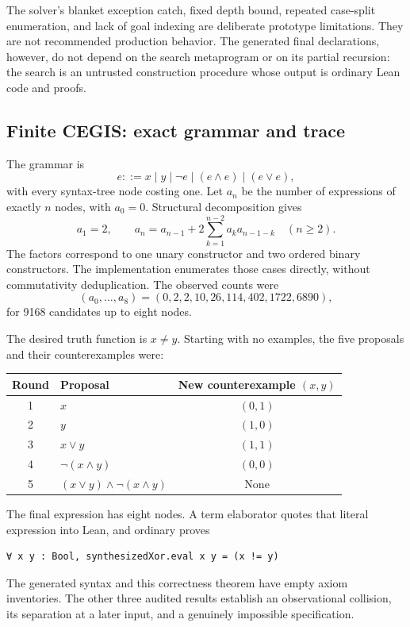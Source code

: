 The solver's blanket exception catch, fixed depth bound, repeated case-split enumeration, and lack of goal indexing are deliberate prototype limitations. They are not recommended production behavior. The generated final declarations, however, do not depend on the search metaprogram or on its partial recursion: the search is an untrusted construction procedure whose output is ordinary Lean code and proofs.

\subsection{Finite CEGIS: exact grammar and trace}

The grammar is
\[
 e::=x\mid y\mid\neg e\mid(e\land e)\mid(e\lor e),
\]
with every syntax-tree node costing one. Let $a_n$ be the number of expressions of exactly $n$ nodes, with $a_0=0$. Structural decomposition gives
\[
 a_1=2,\qquad
 a_n=a_{n-1}+2\sum_{k=1}^{n-2}a_k a_{n-1-k}\quad(n\ge2).
\]
The factors correspond to one unary constructor and two ordered binary constructors. The implementation enumerates those cases directly, without commutativity deduplication. The observed counts were
\[
 (a_0,\ldots,a_8)=(0,2,2,10,26,114,402,1722,6890),
\]
for 9168 candidates up to eight nodes.

The desired truth function is $x\ne y$. Starting with no examples, the five proposals and their counterexamples were:
\begin{center}\small
\begin{tabular}{@{}clc@{}}
\toprule
Round & Proposal & New counterexample $(x,y)$ \\
\midrule
1 & $x$ & $(0,1)$ \\
2 & $y$ & $(1,0)$ \\
3 & $x\lor y$ & $(1,1)$ \\
4 & $\neg(x\land y)$ & $(0,0)$ \\
5 & $(x\lor y)\land\neg(x\land y)$ & None \\
\bottomrule
\end{tabular}
\end{center}
The final expression has eight nodes. A term elaborator quotes that literal expression into Lean, and ordinary  proves
\begin{lstlisting}
∀ x y : Bool, synthesizedXor.eval x y = (x != y)
\end{lstlisting}
The generated syntax and this correctness theorem have empty axiom inventories. The other three audited results establish an observational collision, its separation at a later input, and a genuinely impossible specification.

